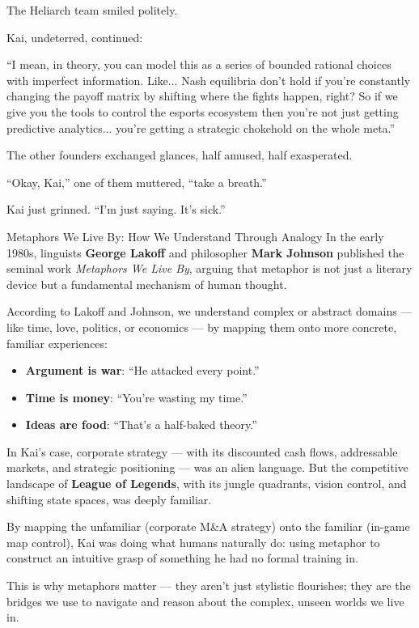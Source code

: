 The Heliarch team smiled politely.

Kai, undeterred, continued:

“I mean, in theory, you can model this as a series of bounded rational choices with imperfect information. 
Like... Nash equilibria don’t hold if you’re constantly changing the payoff matrix by shifting where the 
fights happen, right? So if we give you the tools to control the esports ecosystem then you’re not just 
getting predictive analytics... you’re getting a strategic chokehold on the whole meta.”

The other founders exchanged glances, half amused, half exasperated.

“Okay, Kai,” one of them muttered, “take a breath.”

Kai just grinned.
“I’m just saying. It’s sick.”

\medskip

\begin{HistoricalSidebar}{Metaphors We Live By: How We Understand Through Analogy}
In the early 1980s, linguists \textbf{George Lakoff} and philosopher \textbf{Mark Johnson} published the seminal work \textit{Metaphors We Live By}, arguing that metaphor is not just a literary device but a fundamental mechanism of human thought.

\medskip

According to Lakoff and Johnson, we understand complex or abstract domains — like time, love, politics, or economics — by mapping them onto more concrete, familiar experiences:

\medskip

\begin{itemize}
    \item \textbf{Argument is war}: ``He attacked every point.''  
    \item \textbf{Time is money}: ``You're wasting my time.''
    \item \textbf{Ideas are food}: ``That's a half-baked theory.''
\end{itemize}

\medskip

In Kai's case, corporate strategy — with its discounted cash flows, addressable markets, and strategic positioning — was an alien language.  
But the competitive landscape of \textbf{League of Legends}, with its jungle quadrants, vision control, and shifting state spaces, was deeply familiar.

\medskip

By mapping the unfamiliar (corporate M\&A strategy) onto the familiar (in-game map control), Kai was doing what humans naturally do:  
using metaphor to construct an intuitive grasp of something he had no formal training in.

\medskip

This is why metaphors matter — they aren't just stylistic flourishes; they are the bridges we use to navigate and reason about the complex, unseen worlds we live in.
\end{HistoricalSidebar}
    
